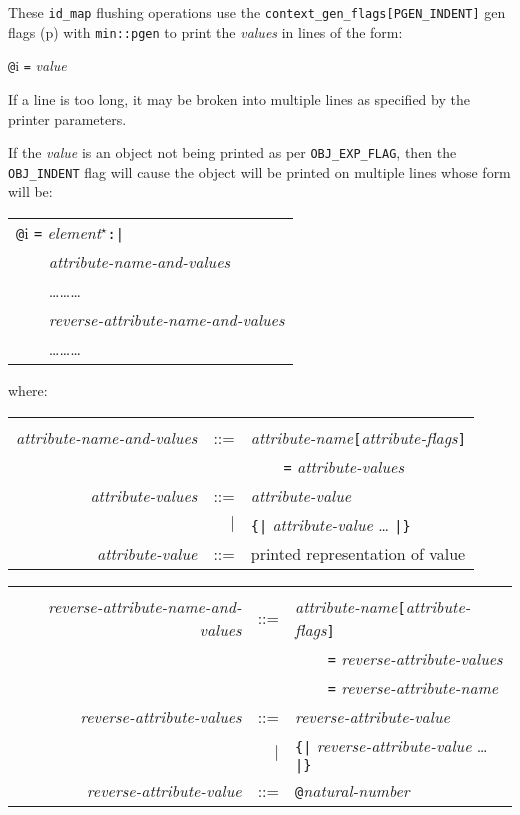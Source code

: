 \documentclass[12pt]{article}
\newcommand{\pagref}[1]{p\pageref{#1}}
\newcommand{\EOL}{\penalty \exhyphenpenalty}
\begin{document}
These {\tt id\_map} flushing operations use the
{\tt context\_\EOL gen\_\EOL flags[PGEN\_INDENT]} gen flags
(\pagref{PGEN_INDENT}) with {\tt min::\EOL pgen}
to print the {\em values} in lines of the form:
\begin{center}
\verb|@|i \verb|=| {\em value}
\end{center}
If a line is too long, it may be broken into multiple lines
as specified by the printer parameters.

If the {\em value} is an object not being printed as per
{\tt OBJ\_\EOL EXP\_\EOL FLAG}, then the {\tt OBJ\_\EOL INDENT} flag
will cause the object will be printed on
multiple lines whose form will be:\label{GEN-OBJ-FORM}
\begin{center}
\begin{tabular}{l}
\verb/@/i \verb/=/ {\em element}$^\star$\verb/:|/ \\
\verb|    |{\em attribute-name-and-values}\\
\verb|    |\ldots\ldots\ldots\\
\verb|    |{\em reverse-attribute-name-and-values}\\
\verb|    |\ldots\ldots\ldots\\
\end{tabular}
\end{center}

where:

\begin{tabular}{rrl}\hspace*{3in}\\[-2ex]
{\em attribute-name-and-values} & ::= &
    {\em attribute-name}\verb|[|{\em attribute-flags}\verb|]| \\
    	&  & \verb|    =| {\em attribute-values}
\\[1ex]
{\em attribute-values} & ::= & {\em attribute-value} \\
                       & $|$ & \verb/{|/ {\em attribute-value} \ldots
		               \verb/|}/
\\[1ex]
{\em attribute-value} & ::= & printed representation of value
\end{tabular}

\begin{tabular}{rrl}\hspace*{3in}\\[-2ex]
{\em reverse-attribute-name-and-values} & ::= &
    {\em attribute-name}\verb|[|{\em attribute-flags}\verb|]| \\
    	&  & \verb|    =| {\em reverse-attribute-values} \\
	&  & \verb|    =| {\em reverse-attribute-name}
\\[1ex]
{\em reverse-attribute-values} & ::= & {\em reverse-attribute-value} \\
                       & $|$ & \verb/{|/ {\em reverse-attribute-value} \ldots
		               \verb/|}/
\\[1ex]
{\em reverse-attribute-value} & ::= & \verb|@|{\em natural-number}
\end{tabular}
\end{document}
